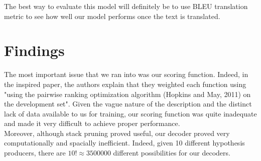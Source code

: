 \documentclass{article}
\begin{document}
The best way to evaluate this model will definitely be to use BLEU translation metric to see how well our model performs once the text is translated.

\section{Findings}
The most important issue that we ran into was our scoring function. Indeed, in the inspired paper, the authors explain that they weighted each function using "using the pairwise ranking optimization algorithm (Hopkins and May, 2011) on the development set". Given the vague nature of the description and the distinct lack of data available to us for training, our scoring function was quite inadequate and made it very difficult to achieve proper performance.\\

Moreover, although stack pruning proved useful, our decoder proved very computationally and spacially inefficient. Indeed, given 10 different hypothesis producers, there are $10! \approx 3 500 000$ different possibilities for our decoders. 
\end{document}
